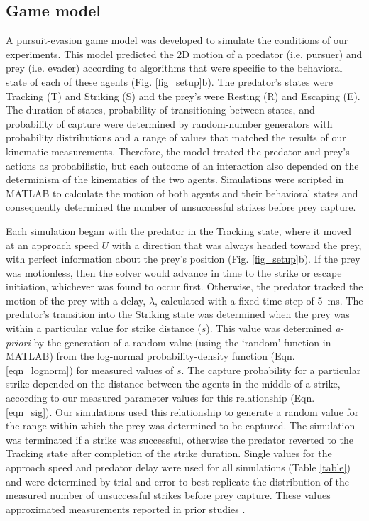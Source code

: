 \documentclass[]{rsos}%
\begin{document}
\subsection{Game model}

A pursuit-evasion game model was developed to simulate the conditions of our experiments. 
This model predicted the 2D motion of a predator (i.e. pursuer) and prey (i.e. evader) according to algorithms that were specific to the behavioral state of each of these agents (Fig. \ref{fig_setup}b). 
The predator's states were Tracking (T) and Striking (S) and the prey's were Resting (R) and Escaping (E). 
The duration of states, probability of transitioning between states, and probability of capture were determined by random-number generators with probability distributions and a range of values that matched the results of our kinematic measurements.
Therefore, the model treated the predator and prey's actions as probabilistic, but each outcome of an interaction also depended on the determinism of the kinematics of the two agents.
Simulations were scripted in MATLAB to calculate the motion of both agents and their behavioral states and consequently determined the number of unsuccessful strikes before prey capture.

Each simulation began with the predator in the Tracking state, where it moved at an approach speed $U$ with a direction that was always headed toward the prey, with perfect information about the prey's position (Fig. \ref{fig_setup}b). 
If the prey was motionless, then the solver would advance in time to the strike or escape initiation, whichever was found to occur first.
Otherwise, the predator tracked the motion of the prey with a delay, $\lambda$, calculated with a fixed time step of \SI{5}{\ms}.  
The predator's transition into the Striking state was determined when the prey was within a particular value for strike distance ($s$). 
This value was determined \textit{a-priori} by the generation of a random value (using the `random' function in MATLAB) from the log-normal probability-density function (Eqn. \ref{eqn_lognorm}) for measured values of $s$.
The capture probability for a particular strike depended on the distance between the agents in the middle of a strike, according to our measured parameter values for this relationship (Eqn. \ref{eqn_sig}).
Our simulations used this relationship to generate a random value for the range within which the prey was determined to be captured.
The simulation was terminated if a strike was successful, otherwise the predator reverted to the Tracking state after completion of the strike duration.
Single values for the approach speed and predator delay were used for all simulations (Table \ref{table}) and were determined by trial-and-error to best replicate the distribution of the measured number of unsuccessful strikes before prey capture. 
These values approximated measurements reported in prior studies \cite{McHenry:2005tc, Stewart:2013bha}. 
\end{document}
